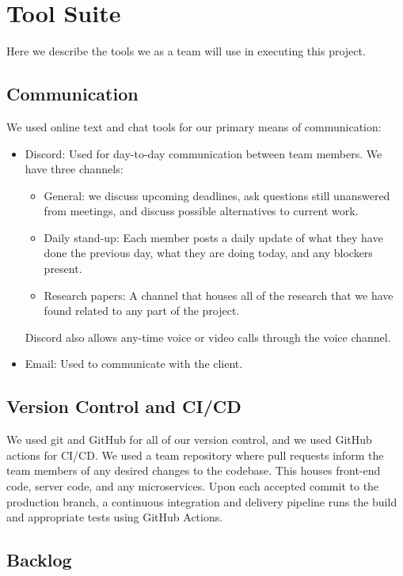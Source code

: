 \section{Tool Suite}

Here we describe the tools we as a team will use in executing this project.

\subsection{Communication}
We used online text and chat tools for our primary means of communication:
\begin{itemize}
    \item Discord: Used for day-to-day communication between team members. We have three channels:
    \begin{itemize}
        \item General: we discuss upcoming deadlines, ask questions still unanswered from meetings, and discuss possible alternatives to current work.
        \item Daily stand-up: Each member posts a daily update of what they have done the previous day, what they are doing today, and any blockers present. 
        \item Research papers: A channel that houses all of the research that we have found related to any part of the project. 
    \end{itemize}
    Discord also allows any-time voice or video calls through the voice channel.
    \item Email: Used to communicate with the client.
\end{itemize}

\subsection{Version Control and CI/CD}
We used git and GitHub for all of our version control, and we used GitHub actions for CI/CD. We used a team repository where pull requests inform the team members of any desired changes to the codebase. This houses front-end code, server code, and any microservices. Upon each accepted commit to the production branch, a continuous integration and delivery pipeline runs the build and appropriate tests using GitHub Actions.

\subsection{Backlog}

